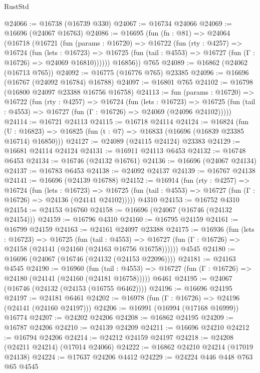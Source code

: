 \begin{lexlean}{RustStd}
\begin{coremodule}
@24066 := @16738 (@16739 @330)
@24067 := @16734 @24066
@24069 := @16696 (@24067 @16763)
@24086 := @16695
    (fun (fn : @81) =>
    @24064
      (@16718
        (@16721
          (fun (params : @16720) =>
          @16722
            (fun (rty : @4257) =>
            @16724
              (fun (lets : @16723) =>
              @16725 (fun (tail : @4553) => @16727 (fun (Γ : @16726) => @24069 @16810))))))
        @16856))
    @765
@24089 := @16862 (@24062 (@16713 @765))
@24092 := @16775 (@16776 @765) @23385
@24096 := @16696 (@16767 (@24092 @16784) @16788)
@24097 := @16801 @765
@24102 := @16798 (@16800 @24097 @23388 @16756 @16758)
@24113 := fun (params : @16720) =>
  @16722
    (fun (rty : @4257) =>
    @16724
      (fun (lets : @16723) =>
      @16725 (fun (tail : @4553) => @16727 (fun (Γ : @16726) => @24069 (@24096 @24102)))))
@24114 := @16721 @24113
@24115 := @16718 @24114
@24124 := @16824
    (fun (U : @16823) => @16825 (fun (t : @7) => @16833 (@16696 (@16839 @23385 @16714) @16850)))
@24127 := @24089 (@24115 @24124) @23383
@24129 := @16681 @24114 @24124
@24131 := @16911 @24113 @6453
@24132 := @16748 @6453
@24134 := @16746 (@24132 @16761)
@24136 := @16696 (@24067 @24134)
@24137 := @16783 @6453
@24138 := @24092 @24137
@24139 := @16767 @24138
@24141 := @16696 (@24139 @16788)
@24152 := @16914
    (fun (rty : @4257) =>
    @16724
      (fun (lets : @16723) =>
      @16725 (fun (tail : @4553) => @16727 (fun (Γ : @16726) => @24136 (@24141 @24102)))))
    @4310
@24153 := @16752 @4310
@24154 := @24153 @16760
@24158 := @16696 (@24067 (@16746 (@24132 @24154)))
@24159 := @16796 @4310
@24160 := @16795 @24159
@24161 := @16799 @24159
@24163 := @24161 @24097 @23388
@24175 := @16936
    (fun (lets : @16723) =>
    @16725
      (fun (tail : @4553) =>
      @16727 (fun (Γ : @16726) => @24158 (@24141 (@24160 (@24163 @16756 @16758))))))
    @4545
@24180 := @16696 (@24067 (@16746 (@24132 (@24153 @22096))))
@24181 := @24163 @4545
@24190 := @16960
    (fun (tail : @4553) => @16727 (fun (Γ : @16726) => @24180 (@24141 (@24160 (@24181 @16758)))))
    @6461
@24195 := @24067 (@16746 (@24132 (@24153 (@16755 @6462))))
@24196 := @16696 @24195
@24197 := @24181 @6461
@24202 := @16978 (fun (Γ : @16726) => @24196 (@24141 (@24160 @24197)))
@24206 := @16991 (@16994 (@17168 @16999)) @16774
@24207 := @24202 @24206
@24208 := @16862 @24195
@24209 := @16787 @24206
@24210 := @24139 @24209
@24211 := @16696 @24210
@24212 := @16794 @24206
@24214 := @24212 @24159 @24197
@24218 := @24208 (@24211 @24214) (@17014 @24066)
@24222 := @16862 @24210 @24214 (@17019 @24138)
@24224 := @17637 @24206 @4412
@24229 := @24224 @446 @448 @763 @65 @4545

\end{coremodule}
\end{lexlean}
